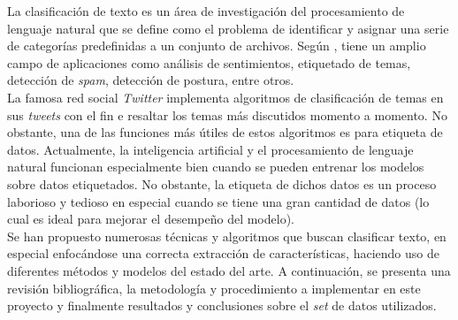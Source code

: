 La clasificación de texto es un área de investigación del procesamiento de lenguaje natural que se define como el problema de identificar y asignar una serie de categorías predefinidas a un conjunto de archivos. Según \cite{mokey_learn}, tiene un amplio campo de aplicaciones como análisis de sentimientos, etiquetado de temas, detección de \textit{spam}, detección de postura, entre otros.\\

La famosa red social \textit{Twitter} implementa algoritmos de clasificación de temas en sus \textit{tweets} con el fin e resaltar los temas más discutidos momento a momento. No obstante, una de las funciones más útiles de estos algoritmos es para etiqueta de datos. Actualmente, la inteligencia artificial y el procesamiento de lenguaje natural funcionan especialmente bien cuando se pueden entrenar los modelos sobre datos etiquetados. No obstante, la etiqueta de dichos datos es un proceso laborioso y tedioso en especial cuando se tiene una gran cantidad de datos (lo cual es ideal para mejorar el desempeño del modelo).\\

Se han propuesto numerosas técnicas y algoritmos que buscan clasificar texto, en especial enfocándose una correcta extracción de características, haciendo uso de diferentes métodos y modelos del estado del arte. A continuación, se presenta una revisión bibliográfica, la metodología y procedimiento a implementar en este proyecto y finalmente resultados y conclusiones sobre el \textit{set} de datos utilizados.